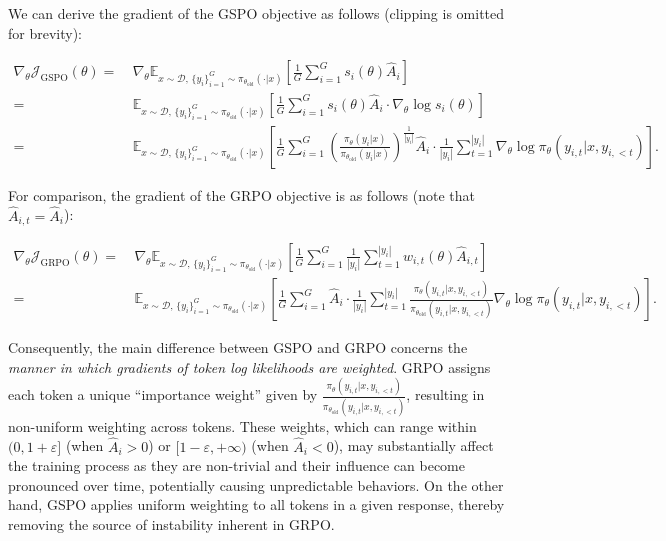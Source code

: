 We can derive the gradient of the GSPO objective as follows (clipping is omitted for brevity):

\begin{align}
\nabla_{\theta} \mathcal{J}_\text{GSPO} (\theta)
=&\ 
\nabla_{\theta} \mathbb{E}_{ x \sim \mathcal{D},\, \{y_i\}_{i=1}^G \sim \pi_{\theta_\text{old}}( \cdot | x) }
\left[ 
\frac{1}{G} \sum_{i=1}^{G} s_{i}(\theta) \widehat{A}_{i}
\right] \\
= &\ 
\mathbb{E}_{ x \sim \mathcal{D},\, \{y_i\}_{i=1}^G \sim \pi_{\theta_\text{old}}( \cdot | x) }
\left[ 
\frac{1}{G} \sum_{i=1}^{G}
s_{i}(\theta) \widehat{A}_{i}
\cdot \nabla_{\theta} \log s_{i}(\theta)
\right] \\
=&\ 
\mathbb{E}_{ x \sim \mathcal{D},\, \{y_i\}_{i=1}^G \sim \pi_{\theta_\text{old}}( \cdot | x) }
\left[ 
\frac{1}{G} \sum_{i=1}^{G} 
\left( \frac{ \pi_{\theta} (y_i | x) }{ \pi_{\theta_\text{old}} (y_i | x)} \right)^{\frac{1}{|y_i|}} \widehat{A}_{i} 
\cdot \frac{1}{|y_i|} \sum_{t=1}^{|y_i|} \nabla_{\theta} \log \pi_{\theta} (y_{i,t} | x, y_{i,<t}) 
\right].
\label{equ:gspo_grad}
\end{align}

For comparison, the gradient of the GRPO objective is as follows (note that $\widehat{A}_{i,t} = \widehat{A}_{i}$):

\begin{align}
\nabla_{\theta} \mathcal{J}_\text{GRPO} (\theta) 
=&\ 
\nabla_{\theta} \mathbb{E}_{ x \sim \mathcal{D},\, \{y_i\}_{i=1}^G \sim \pi_{\theta_\text{old}}( \cdot | x) }
\left[ \frac{1}{G} \sum_{i=1}^{G} \frac{1}{|y_i|} \sum_{t=1}^{|y_i|} 
w_{i,t}(\theta) \widehat{A}_{i,t}
\right] \\
=&\
\mathbb{E}_{ x \sim \mathcal{D},\, \{y_i\}_{i=1}^G \sim \pi_{\theta_\text{old}}( \cdot | x) }
\left[ \frac{1}{G} \sum_{i=1}^{G} \widehat{A}_{i} 
\cdot \frac{1}{|y_i|} \sum_{t=1}^{|y_i|} 
\frac{ \pi_{\theta} (y_{i,t} | x, y_{i,<t}) }{ \pi_{\theta_\text{old}} (y_{i,t} | x,y_{i,<t})} 
\nabla_{\theta} \log \pi_{\theta} (y_{i,t} | x, y_{i,<t})  
\right].
\end{align}

Consequently, the main difference between GSPO and GRPO concerns the \textit{manner in which gradients of token log likelihoods are weighted}. GRPO assigns each token a unique ``importance weight'' given by $\frac{ \pi_{\theta} (y_{i,t} | x, y_{i,<t}) }{ \pi_{\theta_\text{old}} (y_{i,t} | x,y_{i,<t})}$, resulting in non-uniform weighting across tokens. These weights, which can range within $(0, 1+\varepsilon]$ (when $\widehat{A}_{i} >0$) or $[1-\varepsilon, +\infty)$ (when $\widehat{A}_{i} < 0$), may substantially affect the training process as they are non-trivial and their influence can become pronounced over time, potentially causing unpredictable behaviors. On the other hand, GSPO applies uniform weighting to all tokens in a given response, thereby removing the source of instability inherent in GRPO.

